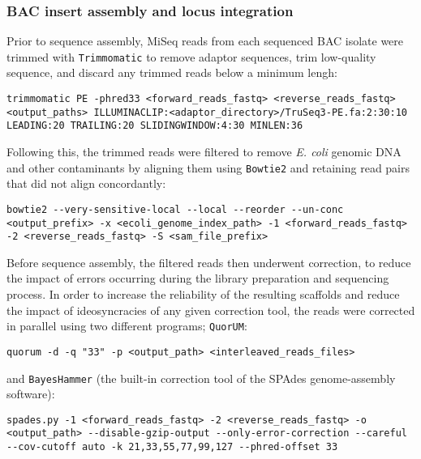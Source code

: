 \subsubsection{BAC insert assembly and locus integration}
\label{sec:bac-methods-assembly}

Prior to sequence assembly, MiSeq reads from each sequenced BAC isolate were trimmed with \lstinline{Trimmomatic} \parencite{bolger2014trimmomatic} to remove adaptor sequences, trim low-quality sequence, and discard any trimmed reads below a minimum lengh:

\begin{lstlisting}
trimmomatic PE -phred33 <forward_reads_fastq> <reverse_reads_fastq> <output_paths> ILLUMINACLIP:<adaptor_directory>/TruSeq3-PE.fa:2:30:10 LEADING:20 TRAILING:20 SLIDINGWINDOW:4:30 MINLEN:36
\end{lstlisting}

Following this, the trimmed reads were filtered to remove \textit{E. coli} genomic DNA and other contaminants by aligning them using \lstinline{Bowtie2} \parencite{langmead2012bowtie2} and retaining read pairs that did not align concordantly:

\begin{lstlisting}
bowtie2 --very-sensitive-local --local --reorder --un-conc <output_prefix> -x <ecoli_genome_index_path> -1 <forward_reads_fastq> -2 <reverse_reads_fastq> -S <sam_file_prefix>
\end{lstlisting}


Before sequence assembly, the filtered reads then underwent correction, to reduce the impact of errors occurring during the library preparation and sequencing process. In order to increase the reliability of the resulting scaffolds and reduce the impact of ideosyncracies of any given correction tool, the reads were corrected in parallel using two different programs; \lstinline{QuorUM}:

\begin{lstlisting}
quorum -d -q "33" -p <output_path> <interleaved_reads_files>
\end{lstlisting}

\noindent and \lstinline{BayesHammer} (the built-in correction tool of the SPAdes genome-assembly software):

\begin{lstlisting}
spades.py -1 <forward_reads_fastq> -2 <reverse_reads_fastq> -o <output_path> --disable-gzip-output --only-error-correction --careful --cov-cutoff auto -k 21,33,55,77,99,127 --phred-offset 33
\end{lstlisting}

